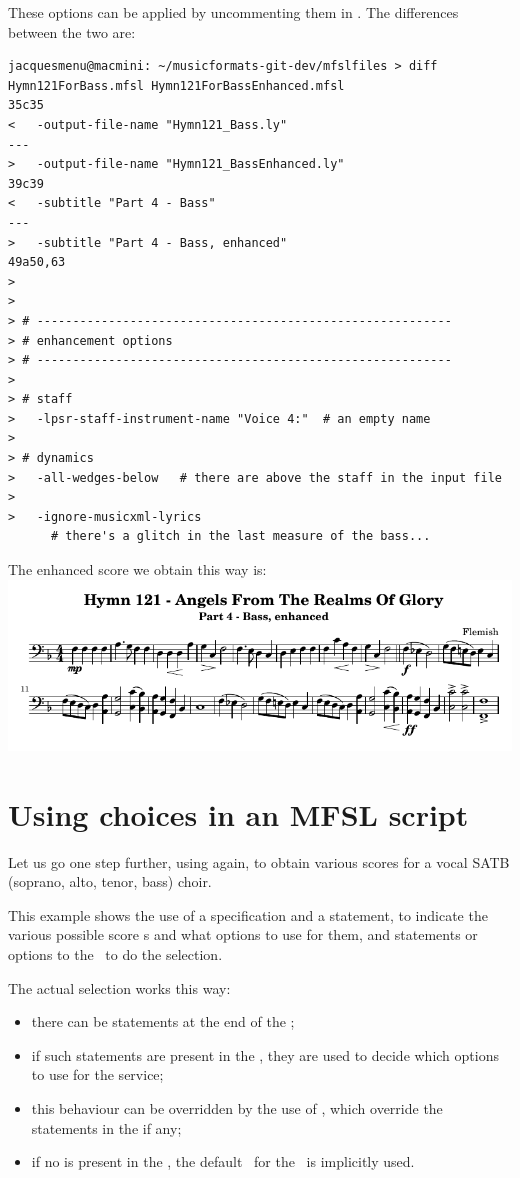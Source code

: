 These options can be applied by uncommenting them in . The differences between the two are:
\begin{lstlisting}[language=Terminal]
jacquesmenu@macmini: ~/musicformats-git-dev/mfslfiles > diff Hymn121ForBass.mfsl Hymn121ForBassEnhanced.mfsl
35c35
<   -output-file-name "Hymn121_Bass.ly"
---
>   -output-file-name "Hymn121_BassEnhanced.ly"
39c39
<   -subtitle "Part 4 - Bass"
---
>   -subtitle "Part 4 - Bass, enhanced"
49a50,63
>
>
> # ----------------------------------------------------------
> # enhancement options
> # ----------------------------------------------------------
>
> # staff
>   -lpsr-staff-instrument-name "Voice 4:"  # an empty name
>
> # dynamics
>   -all-wedges-below   # there are above the staff in the input file
>
>   -ignore-musicxml-lyrics
      # there's a glitch in the last measure of the bass...
\end{lstlisting}

The enhanced score we obtain this way is:\\
\includegraphics[scale=0.8]{../mfgraphics/mfgraphicsHymn121_BassEnhanced.png}


\section{Using choices in an MFSL script}

Let us go one step further, using  again, to obtain various scores for a vocal SATB (soprano, alto, tenor, bass) choir.

This example shows the use of a  specification and a  statement, to indicate the various possible score \choice s and what options to use for them, and  statements or options to the \mfslInterp\ to do the selection.

The actual selection works this way:
\begin{itemize}
\item there can be  statements at the end of the \script;
\item if such statements are present in the \script, they are used to decide which options to use for the service;
\item this behaviour can be overridden by the use of , which override the  statements in the \script if any;
\item if no  is present in the \script, the default \coiceLabel\ for the \choice\ is implicitly used.
\end{itemize}

